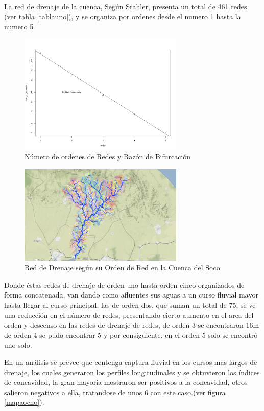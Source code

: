 \documentclass[11pt,]{article}
\begin{document}
La red de drenaje de la cuenca, Según Srahler, presenta un total de 461
redes (ver tabla \ref{tablauno}), y se organiza por ordenes desde el
numero 1 hasta la numero 5

\begin{figure}
\centering
\includegraphics[width=0.70000\textwidth]{num redes razon bif.png}
\caption{Número de ordenes de Redes y Razón de
Bifurcación\label{mapaseis}}
\end{figure}

\begin{figure}
\centering
\includegraphics[width=0.70000\textwidth]{drenaje segun orden.png}
\caption{Red de Drenaje según su Orden de Red en la Cuenca del
Soco\label{mapadiez}}
\end{figure}

Donde éstas redes de drenaje de orden uno hasta orden cinco organizados
de forma concatenada, van dando como afluentes sus aguas a un curso
fluvial mayor hasta llegar al curso principal; las de orden dos, que
suman un total de 75, se ve una reducción en el número de redes,
presentando cierto aumento en el area del orden y descenso en las redes
de drenaje de redes, de orden 3 se encontraron 16m de orden 4 se pudo
encontrar 5 y por consiguiente, en el orden 5 solo se encontró uno solo.

En un análisis se prevee que contenga captura fluvial en los cursos mas
largos de drenaje, los cuales generaron los perfiles longitudinales y se
obtuvieron los índices de concavidad, la gran mayoría mostraron ser
positivos a la concavidad, otros salieron negativos a ella, tratandose
de unos 6 con este caso.(ver figura \ref{mapaocho}).
\end{document}
